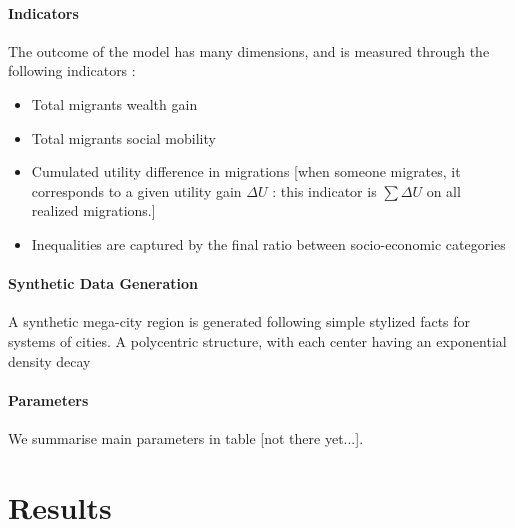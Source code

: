 \paragraph{Indicators}

The outcome of the model has many dimensions, and is measured through the following indicators :

\begin{itemize}
\item Total migrants wealth gain
\item Total migrants social mobility
\item Cumulated utility difference in migrations [when someone migrates, it corresponds to a given utility gain $\Delta U$ : this indicator is $\sum \Delta U$ on all realized migrations.]
\item Inequalities are captured by the final ratio between socio-economic categories
\end{itemize}


\paragraph{Synthetic Data Generation}

A synthetic mega-city region is generated following simple stylized facts for systems of cities. A polycentric structure, with each center having an exponential density decay


\paragraph{Parameters}

We summarise main parameters in table [not there yet...].



\section{Results}







